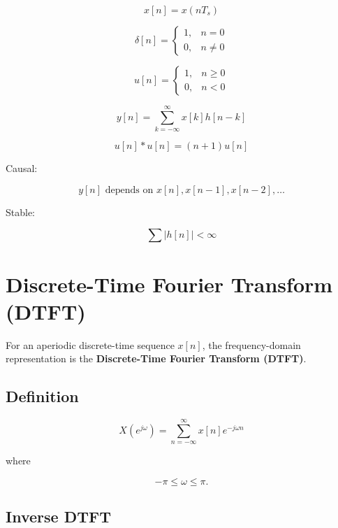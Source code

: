 \begin{tcolorbox}[title=Quick Recall,colback=blue!5]

\[
x[n]=x(nT_s)
\]

\[
\delta[n]=
\begin{cases}
1,& n=0\\
0,& n\neq0
\end{cases}
\]

\[
u[n]=
\begin{cases}
1,& n\ge0\\
0,& n<0
\end{cases}
\]

\[
y[n]=
\sum_{k=-\infty}^{\infty}
x[k]h[n-k]
\]

\[
u[n]*u[n]=(n+1)u[n]
\]

Causal:

\[
y[n]\text{ depends on }x[n],x[n-1],x[n-2],\ldots
\]

Stable:

\[
\sum |h[n]|<\infty
\]

\end{tcolorbox}
\section{Discrete-Time Fourier Transform (DTFT)}

For an aperiodic discrete-time sequence \(x[n]\), the frequency-domain
representation is the \textbf{Discrete-Time Fourier Transform (DTFT)}.


\subsection{Definition}

\[
\boxed{
X(e^{j\omega})=
\sum_{n=-\infty}^{\infty}
x[n]e^{-j\omega n}
}
\]

where

\[
-\pi\le\omega\le\pi.
\]


\subsection{Inverse DTFT}

